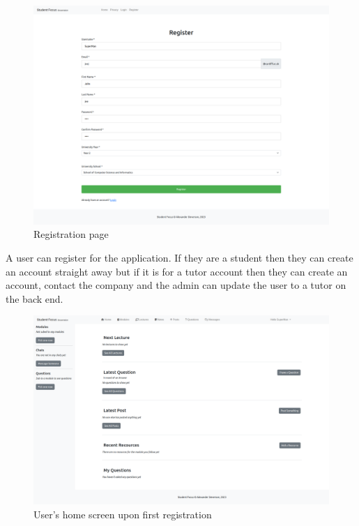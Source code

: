 \begin{figure}[H]
\centering
\includegraphics[scale=0.20]{images/application/2 - register_filed_in.png}
\caption{Registration page}
\label{fig:figure2}
\end{figure}

A user can register for the application. If they are a student then they can create an account straight away but if it is for a tutor account then they can create an account, contact the company and the admin can update the user to a tutor on the back end.

\begin{figure}[H]
\centering
\includegraphics[scale=0.20]{images/application/4 - home_empty.png}
\caption{User's home screen upon first registration}
\label{fig:figure2}
\end{figure}

